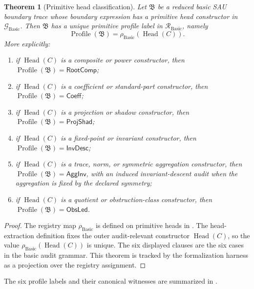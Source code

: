 \documentclass[11pt]{article}
\newcommand{\Prof}{\operatorname{Profile}}
\newcommand{\RootComp}{\mathsf{RootComp}}
\newcommand{\Coeff}{\mathsf{Coeff}}
\newcommand{\InvDesc}{\mathsf{InvDesc}}
\newcommand{\AggInv}{\mathsf{AggInv}}
\newcommand{\ObsLed}{\mathsf{ObsLed}}
\newcommand{\ProjShad}{\mathsf{ProjShad}}
\newcommand{\Head}{\operatorname{Head}}
\newcommand{\Basic}{\operatorname{Basic}}
\newtheorem{theorem}{Theorem}[section]
\theoremstyle{definition}
\begin{document}
\begin{theorem}[Primitive head classification]
\label{thm:sau-primitive-head-classification}
Let \(\mathfrak B\) be a reduced basic SAU boundary trace whose boundary expression has a primitive head constructor in \(\mathcal G_{\Basic}\).  Then \(\mathfrak B\) has a unique primitive profile label in \(\mathcal R_{\Basic}\), namely
\[
\Prof(\mathfrak B)=\rho_{\Basic}(\Head(C)).
\]
More explicitly:
\begin{enumerate}
\item if \(\Head(C)\) is a composite or power constructor, then \(\Prof(\mathfrak B)=\RootComp\);
\item if \(\Head(C)\) is a coefficient or standard-part constructor, then \(\Prof(\mathfrak B)=\Coeff\);
\item if \(\Head(C)\) is a projection or shadow constructor, then \(\Prof(\mathfrak B)=\ProjShad\);
\item if \(\Head(C)\) is a fixed-point or invariant constructor, then \(\Prof(\mathfrak B)=\InvDesc\);
\item if \(\Head(C)\) is a trace, norm, or symmetric aggregation constructor, then \(\Prof(\mathfrak B)=\AggInv\), with an induced invariant-descent audit when the aggregation is fixed by the declared symmetry;
\item if \(\Head(C)\) is a quotient or obstruction-class constructor, then \(\Prof(\mathfrak B)=\ObsLed\).
\end{enumerate}
\end{theorem}

\begin{proof}
The registry map \(\rho_{\Basic}\) is defined on primitive heads in
.  The head-extraction definition fixes the
outer audit-relevant constructor \(\Head(C)\), so the value
\(\rho_{\Basic}(\Head(C))\) is unique.  The six displayed clauses are the six
cases in the basic audit grammar.  This theorem is tracked by the formalization
harness as a projection over the registry assignment.
\end{proof}

The six profile labels and their canonical witnesses are summarized in
.
\end{document}
